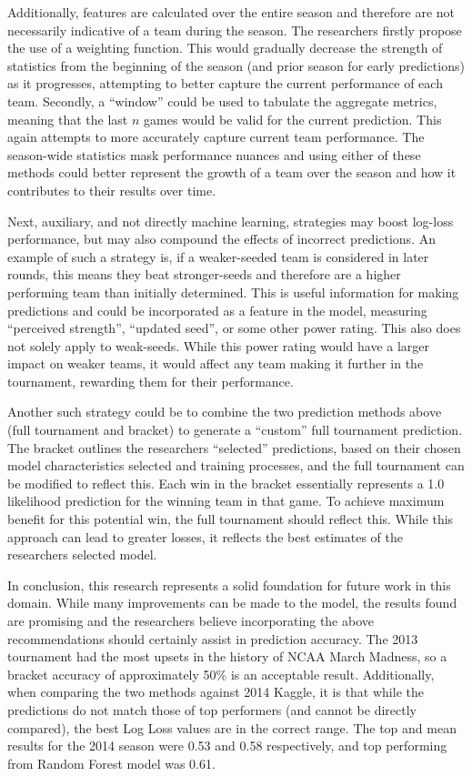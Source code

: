 \documentclass[conference]{IEEEtran}
\begin{document}
{Additionally, features are calculated over the entire season and therefore are not necessarily indicative of a team during the season. 
The researchers firstly propose the use of a weighting function. 
This would gradually decrease the strength of statistics from the beginning of the season (and prior season for early predictions) as it progresses, attempting to better capture the current performance of each team. 
Secondly, a ``window'' could be used to tabulate the aggregate metrics, meaning that the last $n$ games would be valid for the current prediction. 
This again attempts to more accurately capture current team performance. 
The season-wide statistics mask performance nuances and using either of these methods could better represent the growth of a team over the season and how it contributes to their results over time.

Next, auxiliary, and not directly machine learning, strategies may boost log-loss performance, but may also compound the effects of incorrect predictions. 
An example of such a strategy is, if a weaker-seeded team is considered in later rounds, this means they beat stronger-seeds and therefore are a higher performing team than initially determined.
This is useful information for making predictions and could be incorporated as a feature in the model, measuring ``perceived strength'', ``updated seed'', or some other power rating. 
This also does not solely apply to weak-seeds. 
While this power rating would have a larger impact on weaker teams, it would affect any team making it further in the tournament, rewarding them for their performance.

Another such strategy could be to combine the two prediction methods above (full tournament and bracket) to generate a ``custom'' full tournament prediction. 
The bracket outlines the researchers ``selected'' predictions, based on their chosen model characteristics selected and training processes, and the full tournament can be modified to reflect this.
Each win in the bracket essentially represents a 1.0 likelihood prediction for the winning team in that game. 
To achieve maximum benefit for this potential win, the full tournament should reflect this. 
While this approach can lead to greater losses, it reflects the best estimates of the researchers selected model.

In conclusion, this research represents a solid foundation for future work in this domain. 
While many improvements can be made to the model, the results found are promising and the researchers believe incorporating the above recommendations should certainly assist in prediction accuracy. 
The 2013 tournament had the most upsets in the history of NCAA March Madness, so a bracket accuracy of approximately 50\% is an acceptable result.
Additionally, when comparing the two methods against 2014 Kaggle, it is that while the predictions do not match those of top performers (and cannot be directly compared), the best Log Loss values are in the correct range. 
The top and mean results for the 2014 season were 0.53 and 0.58 respectively, and top performing from Random Forest model was 0.61. 

}
\end{document}
